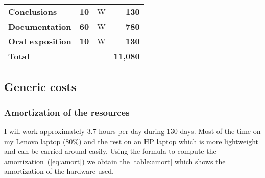 \begin{table}[H]
\begin{tabular}{lrcr}
    \addlinespace[0.5em]
        \textbf{Conclusions} & \textbf{10} & W & \textbf{130} \\
        \textbf{Documentation} & \textbf{60} & W & \textbf{780}\\
        \textbf{Oral exposition} & \textbf{10} & W & \textbf{130} \\
    \addlinespace[1em]
        \textbf{Total} & & & \textbf{11,080} \\

        \bottomrule
    \end{tabular}
\end{table}




\pagebreak
\subsection{Generic costs}


\subsubsection{Amortization of the resources}

I will work approximately 3.7 hours per day during 130 days. Most of the time on
my Lenovo laptop (80\%) and the rest on an HP laptop which is more lightweight
and can be carried around easily. Using the formula to compute the
amortization~(\cref{eq:amort}) we obtain the \cref{table:amort} which shows the
amortization of the hardware used.

